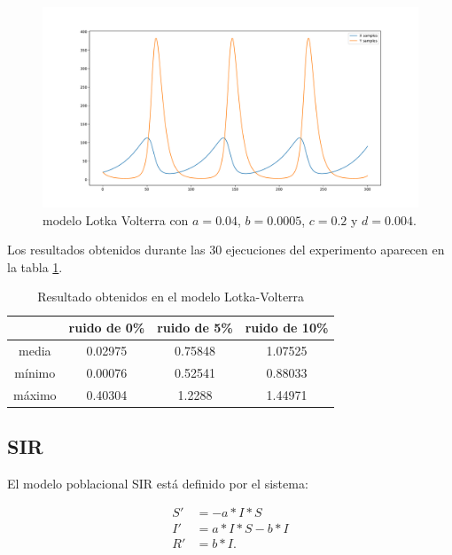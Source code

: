 \begin{figure}[h]
    \centering
    \includegraphics[width=\textwidth]{"figures/lotka_volterra.pdf"}
    \caption{modelo Lotka Volterra con $a = 0.04$, $b = 0.0005$, $c = 0.2$ y $d = 0.004$.}
    \label{fig:lotka_volterra}
\end{figure}

Los resultados obtenidos durante las 30 ejecuciones del experimento aparecen en la tabla \ref{table:experiment_lotka_volterra}.

\begin{table}[!h]
    \centering
    \caption{Resultado obtenidos en el modelo Lotka-Volterra}
    \begin{tabular}{|c|c|c|c|}
        \hline
               & \textbf{ruido de 0\%} & \textbf{ruido de 5\%} & \textbf{ruido de 10\%} \\
        \hline
        media  & 0.02975               & 0.75848               & 1.07525                \\
        \hline
        mínimo & 0.00076               & 0.52541               & 0.88033                \\
        \hline
        máximo & 0.40304               & 1.2288                & 1.44971                \\
        \hline
    \end{tabular}
    \label{table:experiment_lotka_volterra}
\end{table}


\subsection{SIR}

El modelo poblacional SIR está definido por el sistema:

\begin{align*}
    S' & = - a*I*S     \\
    I' & = a*I*S - b*I \\
    R' & = b*I.
\end{align*}

